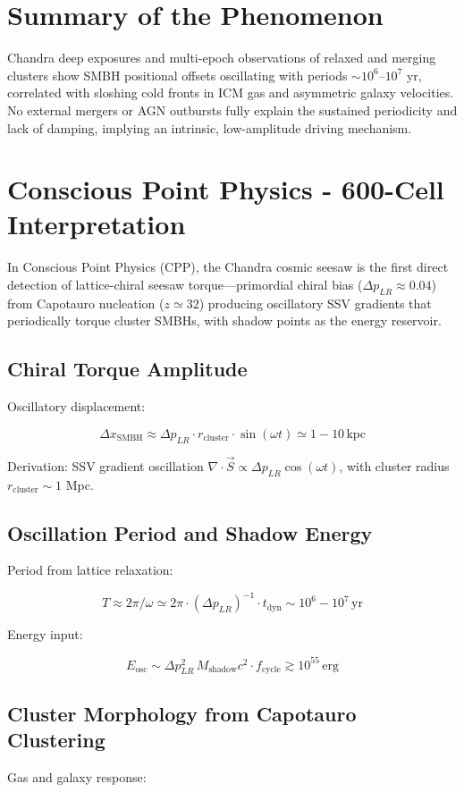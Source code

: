 \documentclass[11pt]{article}
\begin{document}
\section{Summary of the Phenomenon}
Chandra deep exposures and multi-epoch observations of relaxed and merging clusters show SMBH positional offsets oscillating with periods $\sim 10^6$--$10^7$ yr, correlated with sloshing cold fronts in ICM gas and asymmetric galaxy velocities. No external mergers or AGN outbursts fully explain the sustained periodicity and lack of damping, implying an intrinsic, low-amplitude driving mechanism.

\section{Conscious Point Physics - 600-Cell Interpretation}
In Conscious Point Physics (CPP), the Chandra cosmic seesaw is the first direct detection of lattice-chiral seesaw torque—primordial chiral bias ($\Delta p_{LR} \approx 0.04$) from Capotauro nucleation ($z \simeq 32$) producing oscillatory SSV gradients that periodically torque cluster SMBHs, with shadow points as the energy reservoir.

\subsection{Chiral Torque Amplitude}
Oscillatory displacement:

\[
\Delta x_{\text{SMBH}} \approx \Delta p_{LR} \cdot r_{\text{cluster}} \cdot \sin(\omega t) \simeq 1-10 \, \text{kpc}
\]

Derivation: SSV gradient oscillation $\nabla \cdot \vec{S} \propto \Delta p_{LR} \cos(\omega t)$, with cluster radius $r_{\text{cluster}} \sim 1$ Mpc.

\subsection{Oscillation Period and Shadow Energy}
Period from lattice relaxation:

\[
T \approx 2\pi / \omega \simeq 2\pi \cdot (\Delta p_{LR})^{-1} \cdot t_{\text{dyn}} \sim 10^6 - 10^7 \, \text{yr}
\]

Energy input:

\[
E_{\text{osc}} \sim \Delta p_{LR}^2 \, M_{\text{shadow}} c^2 \cdot f_{\text{cycle}} \gtrsim 10^{55} \, \text{erg}
\]

\subsection{Cluster Morphology from Capotauro Clustering}
Gas and galaxy response:
\end{document}
